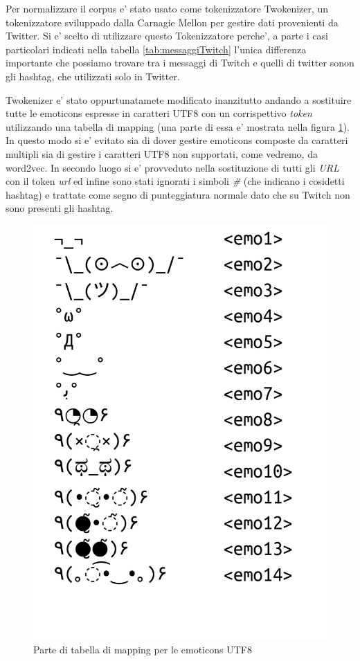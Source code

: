 \documentclass[a4paper,12pt,openright,twoside]{report}
\theoremstyle{definition}
\begin{document}
Per normalizzare il corpus e' stato usato come tokenizzatore Twokenizer, un tokenizzatore sviluppado dalla Carnagie Mellon per gestire dati provenienti da Twitter. 
Si e' scelto di utilizzare questo Tokenizzatore perche', a parte i casi particolari indicati nella tabella
\ref{tab:messaggiTwitch} l'unica differenza importante che possiamo trovare tra i messaggi di Twitch e
quelli di twitter sonon gli
hashtag, che utilizzati solo in Twitter. 

Twokenizer e' stato oppurtunatamete
modificato inanzitutto andando a sostituire tutte le emoticons espresse in caratteri UTF8 con un corrispettivo \emph{token}
utilizzando una tabella di mapping (una parte di essa e' mostrata nella figura \ref{fig:mappingEmo}). In
questo modo si e' evitato sia di dover gestire emoticons composte da caratteri multipli sia di gestire
i caratteri UTF8 non supportati, come vedremo, da word2vec.
In secondo luogo si e' provveduto nella sostituzione di tutti gli \emph{URL} con il token \emph{url} ed infine
sono stati ignorati i simboli \emph{\#} (che indicano i cosidetti hashtag) e trattate come segno di punteggiatura normale dato che su Twitch non
sono presenti gli hashtag.

\begin{figure}[ht]
	\centering
	\includegraphics[scale=0.3]{Immagini/emoticonsTable.pdf}
	\caption{Parte di tabella di mapping per le emoticons UTF8}
	\label{fig:mappingEmo}
\end{figure}
\end{document}
